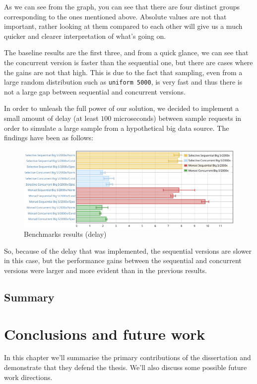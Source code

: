 \documentclass[
  oneside,
  11pt, a4paper,
  footinclude=true,
  headinclude=true,
  cleardoublepage=empty
]{scrbook}
\theoremstyle{definition}
\theoremstyle{definition}
\begin{document}
    As we can see from the graph, you can see that there are four distinct groups corresponding to the ones mentioned above. Absolute values are not that important, rather looking at them compared to each other will give us a much quicker and clearer interpretation of what's going on.
    
    The baseline results are the first three, and from a quick glance, we can see that the concurrent version is faster than the sequential one, but there are cases where the gains are not that high. This is due to the fact that sampling, even from a large random distribution such as \texttt{uniform 5000}, is very fast and thus there is not a large gap between sequential and concurrent versions.
    
    In order to unleash the full power of our solution, we decided to implement a small amount of delay (at least $100$ microseconds) between sample requests in order to simulate a large sample from a hypothetical big data source. The findings have been as follows:
    
    \begin{figure}[H]
        \centering
        \includegraphics[width=\linewidth]{img/delay.pdf}
        \caption{Benchmarks results (delay)}
        \label{fig:delay}
    \end{figure}
    
    So, because of the delay that was implemented, the sequential versions are slower in this case, but the performance gains between the sequential and concurrent versions were larger and more evident than in the previous results.

    \section{Summary}
        
	\chapter{Conclusions and future work}\label{ch-conclusion}
	    In this chapter we’ll summarise the primary contributions of the dissertation and demonstrate that they defend the thesis. We'll also discuss some possible future work directions.
	
\end{document}
